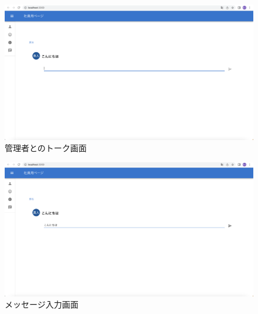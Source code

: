             \begin{figure}[!h]
              \begin{center}
                \includegraphics[scale=0.3, clip]{./img/chat7.png}
                \caption{管理者とのトーク画面}
                \label{fig:図の名前}
              \end{center}
              \end{figure}

              \begin{figure}[!h]
                \begin{center}
                  \includegraphics[scale=0.3, clip]{./img/chat8.png}
                  \caption{メッセージ入力画面}
                  \label{fig:図の名前}
                \end{center}
                \end{figure}

